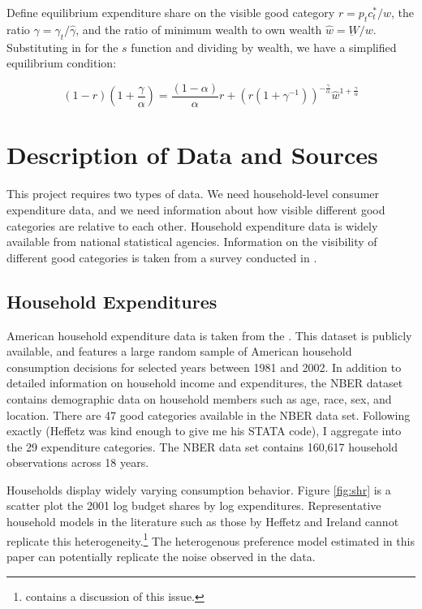 Define equilibrium expenditure share on the visible good category $r = p_t c_t^* / w$, the ratio $\gamma = \gamma_t / \hat{\gamma}$, and the ratio of minimum wealth to own wealth $\hat{w} = \underbar{W} / w$.  Substituting in for the $s$ function and dividing by wealth, we have a simplified equilibrium condition:

\begin{equation}
	\label{eq:eq_cond}
    (1 - r)(1 + \frac{\gamma}{\alpha}) = \frac{\left(1-\alpha\right)}{\alpha} r +  \left(r\left(1 + \gamma^{-1}\right)\right)^{-\frac{\gamma}{\alpha}}\hat{w}^{1+\frac{\gamma}{\alpha}}
\end{equation}

\section{Description of Data and Sources}
This project requires two types of data.  We need household-level consumer expenditure data, and we need information about how visible different good categories are relative to each other.  Household expenditure data is widely available from national statistical agencies.  Information on the visibility of different good categories is taken from a survey conducted in \citet{Heffetz2011}.

\subsection{Household Expenditures}
American household expenditure data is taken from the \citet{NBERCEX2011}.  This dataset is publicly available, and features a large random sample of American household consumption decisions for selected years between 1981 and 2002.  In addition to detailed information on household income and expenditures, the NBER dataset contains demographic data on household members such as age, race, sex, and location.
There are 47 good categories available in the NBER data set.
Following \citet{Heffetz2011} exactly (Heffetz was kind enough to give me his STATA code), I aggregate into the 29 expenditure categories.
The NBER data set contains 160,617 household observations across 18 years.

Households display widely varying consumption behavior.  Figure \ref{fig:shr} is a scatter plot the 2001 log budget shares by log expenditures.  Representative household models in the literature such as those by Heffetz and Ireland cannot replicate this heterogeneity.\footnote{\citet{Heffetz2011} contains a discussion of this issue.} The heterogenous preference model estimated in this paper can potentially replicate the noise observed in the data.

